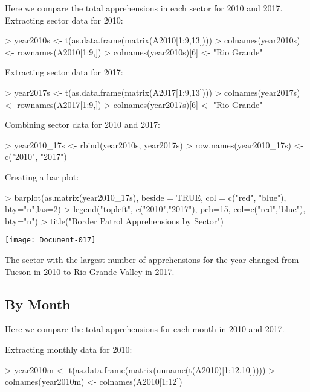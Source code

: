 \documentclass[letterpaper]{article}
\begin{document}
Here we compare the total apprehensions in each sector for 2010 and 2017. 
\medskip
Extracting sector data for 2010:
\begin{Schunk}
\begin{Sinput}
> year2010s <- t(as.data.frame(matrix(A2010[1:9,13])))
> colnames(year2010s) <- rownames(A2010[1:9,])
> colnames(year2010s)[6] <- "Rio Grande"
\end{Sinput}
\end{Schunk}
 
Extracting sector data for 2017:
\begin{Schunk}
\begin{Sinput}
> year2017s <- t(as.data.frame(matrix(A2017[1:9,13])))
> colnames(year2017s) <- rownames(A2017[1:9,])
> colnames(year2017s)[6] <- "Rio Grande"
\end{Sinput}
\end{Schunk}

Combining sector data for 2010 and 2017:
\begin{Schunk}
\begin{Sinput}
> year2010_17s <- rbind(year2010s, year2017s)
> row.names(year2010_17s) <- c("2010", "2017")
\end{Sinput}
\end{Schunk}

Creating a bar plot:
\begin{Schunk}
\begin{Sinput}
> barplot(as.matrix(year2010_17s), beside = TRUE, col = c("red", "blue"), bty="n",las=2)
> legend("topleft", c("2010","2017"), pch=15,  col=c("red","blue"),  bty="n")
> title("Border Patrol Apprehensions by Sector")
\end{Sinput}
\end{Schunk}
\texttt{[image: Document-017]}
    
The sector with the largest number of apprehensions for the year changed from Tucson in 2010 to Rio Grande Valley in 2017.

\subsection{By Month}
Here we compare the total apprehensions for each month in 2010 and 2017.

\medskip

Extracting monthly data for 2010:
\begin{Schunk}
\begin{Sinput}
> year2010m <- t(as.data.frame(matrix(unname(t(A2010)[1:12,10]))))
> colnames(year2010m) <- colnames(A2010[1:12])
\end{Sinput}
\end{Schunk}
\end{document}

